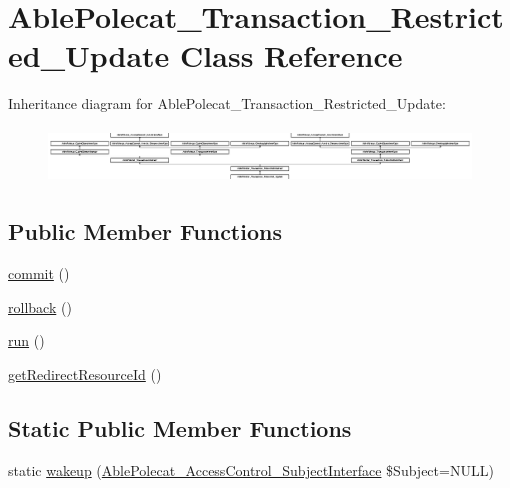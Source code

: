 \hypertarget{class_able_polecat___transaction___restricted___update}{}\section{Able\+Polecat\+\_\+\+Transaction\+\_\+\+Restricted\+\_\+\+Update Class Reference}
\label{class_able_polecat___transaction___restricted___update}
Inheritance diagram for Able\+Polecat\+\_\+\+Transaction\+\_\+\+Restricted\+\_\+\+Update\+:\begin{figure}[H]
\begin{center}
\leavevmode
\includegraphics[height=1.463415cm]{class_able_polecat___transaction___restricted___update}
\end{center}
\end{figure}
\subsection*{Public Member Functions}
\begin{DoxyCompactItemize}
\item 
\hyperlink{class_able_polecat___transaction___restricted___update_af5674c27d4a92f6228565010eacbb9cb}{commit} ()
\item 
\hyperlink{class_able_polecat___transaction___restricted___update_afa549adf79e3f8c09fe8f903dd5fbfa7}{rollback} ()
\item 
\hyperlink{class_able_polecat___transaction___restricted___update_afb0fafe7e02a3ae1993c01c19fad2bae}{run} ()
\item 
\hyperlink{class_able_polecat___transaction___restricted___update_abd12d28cbfdd5a45fba85bbac51a0b12}{get\+Redirect\+Resource\+Id} ()
\end{DoxyCompactItemize}
\subsection*{Static Public Member Functions}
\begin{DoxyCompactItemize}
\item 
static \hyperlink{class_able_polecat___transaction___restricted___update_a3f2135f6ad45f51d075657f6d20db2cd}{wakeup} (\hyperlink{interface_able_polecat___access_control___subject_interface}{Able\+Polecat\+\_\+\+Access\+Control\+\_\+\+Subject\+Interface} \$Subject=N\+U\+L\+L)
\end{DoxyCompactItemize}
